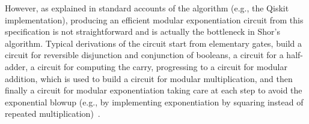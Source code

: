 \noindent However, as explained in standard accounts of the algorithm (e.g., the Qiskit implementation), producing an efficient
modular exponentiation circuit from this specification  is not straightforward and is actually the bottleneck in Shor’s algorithm. Typical
derivations of the circuit start from elementary gates, build a circuit for reversible disjunction and conjunction of
booleans, a circuit for a half-adder, a circuit for computing the carry, progressing to a circuit for modular addition,
which is used to build a circuit for modular multiplication, and then finally a circuit for modular exponentiation
taking care at each step to avoid the exponential blowup (e.g., by implementing exponentiation by squaring instead of repeated
multiplication)~\cite{shorefficient}.
